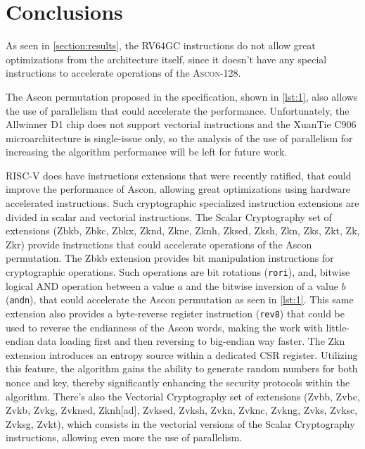 \documentclass[11pt,twoside]{article}
\begin{document}
\section{Conclusions}

As seen in \cref{section:results}, the \textsf{RV64GC} instructions do not allow great optimizations from the architecture itself, since it doesn't have any special instructions to accelerate operations of the \textsc{Ascon-128}.

The Ascon permutation proposed in the specification, shown in \cref{lst:1}, also allows the use of parallelism that could accelerate the performance. Unfortunately, the Allwinner D1 chip does not support vectorial instructions and the XuanTie C906 microarchitecture is single-issue only, so the analysis of the use of parallelism for increasing the algorithm performance will be left for future work.

RISC-V does have instructions extensions that were recently ratified, that could improve the performance of Ascon, allowing great optimizations using hardware accelerated instructions. Such cryptographic specialized instruction extensions are divided in scalar \cite{riscvCryptoVol1} and vectorial \cite{riscvCryptoVol2} instructions. The Scalar Cryptography set of extensions (\textsf{Zbkb}, \textsf{Zbkc}, \textsf{Zbkx}, \textsf{Zknd}, \textsf{Zkne}, \textsf{Zknh}, \textsf{Zksed}, \textsf{Zksh}, \textsf{Zkn}, \textsf{Zks}, \textsf{Zkt}, \textsf{Zk}, \textsf{Zkr}) provide instructions that could accelerate operations of the Ascon permutation. The \textsf{Zbkb} extension provides bit manipulation instructions for cryptographic operations. Such operations are bit rotations (\texttt{rori}), and, bitwise logical AND operation between a value $a$ and the bitwise inversion of a value $b$ (\texttt{andn}), that could accelerate the Ascon permutation as seen in \cref{lst:1}. This same extension also provides a byte-reverse register instruction (\texttt{rev8}) that could be used to reverse the endianness of the Ascon words, making the work with little-endian data loading first and then reversing to big-endian way faster. The \textsf{Zkn} extension introduces an entropy source within a dedicated CSR register. Utilizing this feature, the algorithm gains the ability to generate random numbers for both nonce and key, thereby significantly enhancing the security protocols within the algorithm. There's also the Vectorial Cryptography set of extensions (\textsf{Zvbb}, \textsf{Zvbc}, \textsf{Zvkb}, \textsf{Zvkg}, \textsf{Zvkned}, \textsf{Zknh[ad]}, \textsf{Zvksed}, \textsf{Zvksh}, \textsf{Zvkn}, \textsf{Zvknc}, \textsf{Zvkng}, \textsf{Zvks}, \textsf{Zvksc}, \textsf{Zvksg}, \textsf{Zvkt}), which consists in the vectorial versions of the Scalar Cryptography instructions, allowing even more the use of parallelism.

\printbibliography
\end{document}
